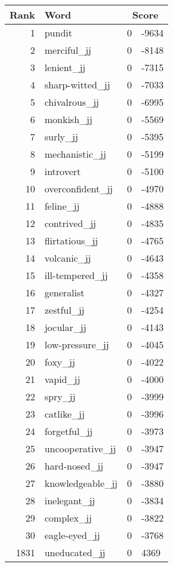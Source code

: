 \begin{longtable}[!htbp]{| rlr@{.}l |}
    \hline
    \textbf{Rank} & \textbf{Word} & \multicolumn{2}{c|}{\textbf{Score}} \\
    \hline
    \endhead
    1 & pundit & 0 & -9634 \\
    2 & merciful\_jj & 0 & -8148 \\
    3 & lenient\_jj & 0 & -7315 \\
    4 & sharp-witted\_jj & 0 & -7033 \\
    5 & chivalrous\_jj & 0 & -6995 \\
    6 & monkish\_jj & 0 & -5569 \\
    7 & surly\_jj & 0 & -5395 \\
    8 & mechanistic\_jj & 0 & -5199 \\
    9 & introvert & 0 & -5100 \\
    10 & overconfident\_jj & 0 & -4970 \\
    11 & feline\_jj & 0 & -4888 \\
    12 & contrived\_jj & 0 & -4835 \\
    13 & flirtatious\_jj & 0 & -4765 \\
    14 & volcanic\_jj & 0 & -4643 \\
    15 & ill-tempered\_jj & 0 & -4358 \\
    16 & generalist & 0 & -4327 \\
    17 & zestful\_jj & 0 & -4254 \\
    18 & jocular\_jj & 0 & -4143 \\
    19 & low-pressure\_jj & 0 & -4045 \\
    20 & foxy\_jj & 0 & -4022 \\
    21 & vapid\_jj & 0 & -4000 \\
    22 & spry\_jj & 0 & -3999 \\
    23 & catlike\_jj & 0 & -3996 \\
    24 & forgetful\_jj & 0 & -3973 \\
    25 & uncooperative\_jj & 0 & -3947 \\
    26 & hard-nosed\_jj & 0 & -3947 \\
    27 & knowledgeable\_jj & 0 & -3880 \\
    28 & inelegant\_jj & 0 & -3834 \\
    29 & complex\_jj & 0 & -3822 \\
    30 & eagle-eyed\_jj & 0 & -3768 \\
    1831 & uneducated\_jj & 0 & 4369 \\

\end{longtable}
